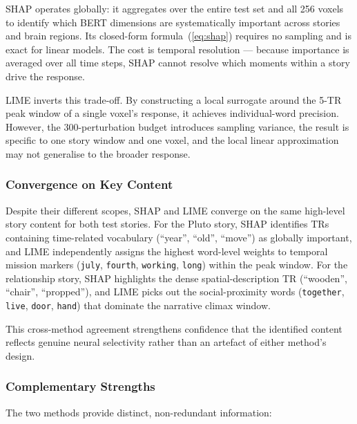 \documentclass[letterpaper,11pt]{article}
\begin{document}
SHAP operates globally: it aggregates over the entire test set and all 256
voxels to identify which BERT dimensions are systematically important across
stories and brain regions.  Its closed-form formula~(\ref{eq:shap}) requires no
sampling and is exact for linear models.  The cost is temporal resolution ---
because importance is averaged over all time steps, SHAP cannot resolve which
moments within a story drive the response.

LIME inverts this trade-off.  By constructing a local surrogate around the 5-TR
peak window of a single voxel's response, it achieves individual-word precision.
However, the 300-perturbation budget introduces sampling variance, the result is
specific to one story window and one voxel, and the local linear approximation
may not generalise to the broader response.

\subsubsection{Convergence on Key Content}

Despite their different scopes, SHAP and LIME converge on the same high-level
story content for both test stories.  For the Pluto story, SHAP identifies
TRs containing time-related vocabulary (``year'', ``old'', ``move'') as globally
important, and LIME independently assigns the highest word-level weights to
temporal mission markers (\texttt{july}, \texttt{fourth}, \texttt{working},
\texttt{long}) within the peak window.  For the relationship story, SHAP
highlights the dense spatial-description TR (``wooden'', ``chair'', ``propped''),
and LIME picks out the social-proximity words (\texttt{together},
\texttt{live}, \texttt{door}, \texttt{hand}) that dominate the narrative climax
window.

This cross-method agreement strengthens confidence that the identified content
reflects genuine neural selectivity rather than an artefact of either method's
design.

\subsubsection{Complementary Strengths}

The two methods provide distinct, non-redundant information:
\end{document}
